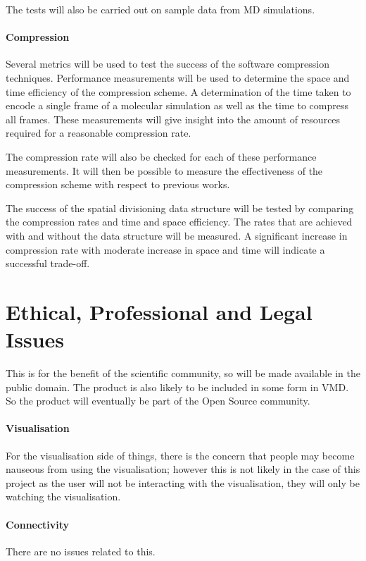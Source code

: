 \documentclass[a4paper,twocolumn]{article}
\begin{document}
The tests will also be carried out on sample data from MD simulations.

\paragraph{Compression}

Several metrics will be used to test the success of the software compression techniques. Performance measurements will be used to determine the space and time efficiency of the compression scheme. A determination of the time taken to encode a single frame of a molecular simulation as well as the time to compress all frames. These measurements will give insight into the amount of resources required for a reasonable compression rate.

The compression rate will also be checked for each of these performance measurements. It will then be possible to measure the effectiveness of the compression scheme with respect to previous works.

The success of the spatial divisioning data structure will be tested by
comparing the compression rates and time and space efficiency. The rates that are 
achieved with and without the data structure will be measured. A significant increase
in compression rate with moderate increase in space and time will indicate a
successful trade-off.


\section{Ethical, Professional and Legal Issues}

This is for the benefit of the scientific community, so will be made available
in the public domain. The product is also likely to be included in some form
in VMD.\citep{VMD} So the product will eventually be part of the Open Source
community.


\paragraph{Visualisation} For the visualisation side of things, there is the
concern that people may become nauseous from using the visualisation; however
this is not likely in the case of this project as the user will not be
interacting with the visualisation, they will only be watching the
visualisation.

\paragraph{Connectivity} There are no issues related to this.
\end{document}
